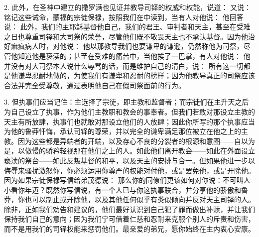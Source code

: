2. 此外，在圣神中建立的撒罗满也见证并教导司铎的权威和权能，说道：  又说：  铭记这些诫命，蒙福的宗徒保禄，按照我们在中读到，当有人对他说： 他回答说：  此外，我们的主耶稣基督他自己，我们的君王、审判者和天主，甚至在受难之日也尊重司铎和大司祭的荣誉，尽管他们既不敬畏天主也不承认基督。因为他治好痲疯病人时，对他说： 他以那教导我们也要谦卑的谦逊，仍然称他为司祭，尽管他知道他是亵渎的；甚至在受难的痛苦中，当他挨了一巴掌，有人对他说： 他并没有对大司祭本人说什么辱骂的话，而是维护自己的清白，说：  所有这一切都是他谦卑忍耐地做的，为使我们有谦卑和忍耐的榜样；因为他教导真正的司祭应该合法并完全受尊敬，通过表明他自己在假司祭面前的行为。\par

3. 但执事们应当记住：主选择了宗徒，即主教和监督者；而宗徒们在主升天之后为自己设立了执事，作为他们主教职和教会的事奉者。但我们若敢对那设立主教的天主有所放肆，执事们也就敢对那设立他们的人放肆；因此你所写的那个执事应当为他的鲁莽忏悔，承认司铎的尊荣，并以完全的谦卑满足那位被立在他之上的主教。因为这些都是异端者的开端，以及存心不良的分裂者的根源和意图——自以为是，以傲慢的骄矜轻视那在他们之上的人。如此他们离开教会——如此在外面设立亵渎的祭台——如此反叛基督的和平，以及天主的安排与合一。但如果他进一步以侮辱来骚扰激怒你，你必须运用你尊严的权能对付他，或是罢免他，或是开除他。因为如果宗徒保禄写信给弟茂德说：  那么你的同僚们更该如何对你说：不可叫人小看你年迈？既然你写信说，有一个人已与你这执事联合，并分享他的骄傲和鲁莽，你也可以制止或开除他，以及其他任何似乎有类似倾向并反对天主司铎的人。除非，正如我们劝告和建议的，他们最好认识到自己犯了罪而做出补赎，并让我们保持我们自己的意向；因为我们宁可借着仁慈和忍耐来克服个别人的斥责和伤害，而不是用我们的司铎权能来惩罚他们。最亲爱的弟兄，愿你始终在主内衷心安康。\par



